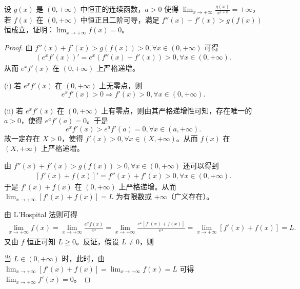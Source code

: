 \documentclass[../../main.tex]{subfiles}%
\begin{document}
\vspace{0.5cm}

\begin{example}
设 \( g(x) \) 是 \( (0,+\infty) \) 中恒正的连续函数，\( a>0 \) 使得 \( \lim_{x \to +\infty} \frac{g(x)}{x^{1 + a}} = +\infty \)，若 \( f(x) \) 在 \( (0,+\infty) \) 中恒正且二阶可导，满足 \( f''(x) + f'(x) > g(f(x)) \) 恒成立，证明：\( \lim_{x \to +\infty} f(x) = 0 \)。
\end{example}
\begin{proof}

由 \( f''(x) + f'(x) > g(f(x)) > 0, \forall x \in (0,+\infty) \) 可得
\begin{align*}
\left( e^x f'(x) \right)' = e^x \left( f''(x) + f'(x) \right) > 0, \forall x \in (0,+\infty).
\end{align*}
从而 \( e^x f'(x) \) 在 \( (0,+\infty) \) 上严格递增。

(i) 若 \( e^x f'(x) \) 在 \( (0,+\infty) \) 上无零点，则
\[
e^x f'(x) > 0 \Rightarrow f'(x) > 0, \forall x \in (0,+\infty).
\]

(ii) 若 \( e^x f'(x) \) 在 \( (0,+\infty) \) 上有零点，则由其严格递增性可知，存在唯一的 \( a > 0 \)，使得 \( e^a f'(a) = 0 \)。于是
\[
e^x f'(x) > e^a f'(a) = 0, \forall x \in (a,+\infty).
\]
故一定存在 \( X > 0 \)，使得 \( f'(x) > 0, \forall x \in (X,+\infty) \)。从而 \( f(x) \) 在 \( (X,+\infty) \) 上严格递增。

由 \( f''(x) + f'(x) > g(f(x)) > 0, \forall x \in (0,+\infty) \) 还可以得到
\begin{align*}
\left[ f'(x) + f(x) \right]' = f''(x) + f'(x) > 0, \forall x \in (0,+\infty).
\end{align*}
于是 \( f'(x) + f(x) \) 在 \( (0,+\infty) \) 上严格递增。从而 \( \lim_{x \to +\infty} \left[ f'(x) + f(x) \right] = L \) 为有限数或 \( +\infty \)（广义存在）。

由 L'Hospital 法则可得
\begin{align*}
\lim_{x \to +\infty} f(x) = \lim_{x \to +\infty} \frac{e^x f(x)}{e^x} = \lim_{x \to +\infty} \frac{e^x \left[ f'(x) + f(x) \right]}{e^x} = \lim_{x \to +\infty} \left[ f'(x) + f(x) \right] = L.
\end{align*}
又由 \( f \) 恒正可知 \( L \geqslant  0 \)。反证，假设 \( L \neq 0 \)，则

\one 当 \( L \in (0,+\infty) \) 时，此时，由 \( \lim_{x \to +\infty} \left[ f'(x) + f(x) \right] = \lim_{x \to +\infty} f(x) = L \) 可得 \( \lim_{x \to +\infty} f'(x) = 0 \)。


\end{proof}
\end{document}
